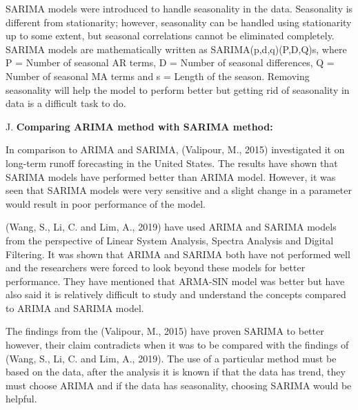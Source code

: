\documentclass[12pt,a4paper]{article}
\begin{document}
\begin{flushleft}
		SARIMA models were introduced to handle seasonality in the data. Seasonality is different from stationarity; however, seasonality can be handled using stationarity up to some extent, but seasonal correlations cannot be eliminated completely. SARIMA models are mathematically written as SARIMA(p,d,q)(P,D,Q)s, where P = Number of seasonal AR terms, D = Number of seasonal differences, Q = Number of seasonal MA terms and s = Length of the season. Removing seasonality will help the model to perform better but getting rid of seasonality in data is a difficult task to do.
		
		J.	\textbf{Comparing ARIMA method with SARIMA method:}
		
		In comparison to ARIMA and SARIMA, (Valipour, M., 2015) investigated it on long-term runoff forecasting in the United States. The results have shown that SARIMA models have performed better than ARIMA model. However, it was seen that SARIMA models were very sensitive and a slight change in a parameter would result in poor performance of the model.
		
		(Wang, S., Li, C. and Lim, A., 2019) have used ARIMA and SARIMA models from the perspective of Linear System Analysis, Spectra Analysis and Digital Filtering. It was shown that ARIMA and SARIMA both have not performed well and  the researchers were forced to look beyond these models for better performance. They have mentioned that ARMA-SIN model was better but have also said it is relatively difficult to study and understand the concepts compared to ARIMA and SARIMA model.
		
		The findings from the (Valipour, M., 2015) have proven SARIMA to better however, their claim contradicts when it was to be compared with the findings of (Wang, S., Li, C. and Lim, A., 2019). The use of a particular method must be based on the data, after the analysis it is known if that the data has trend, they must choose ARIMA and if the data has seasonality, choosing SARIMA would be helpful. 
		

\end{flushleft}
\end{document}
